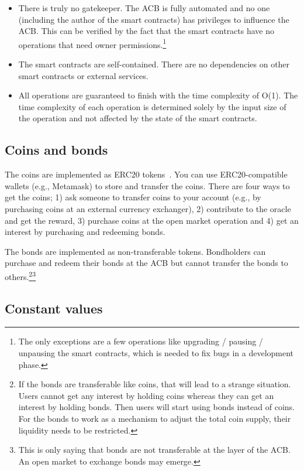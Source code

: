 \documentclass[dvipdfmx,a4paper]{article}
\begin{document}
\begin{itemize}
\item There is truly no gatekeeper. The ACB is fully automated and no one (including the author of the smart contracts) has privileges to influence the ACB. This can be verified by the fact that the smart contracts have no operations that need owner permissions.\footnote{The only exceptions are a few operations like upgrading / pausing / unpausing the smart contracts, which is needed to fix bugs in a development phase.}
\item The smart contracts are self-contained. There are no dependencies on other smart contracts or external services.
\item All operations are guaranteed to finish with the time complexity of O(1). The time complexity of each operation is determined solely by the input size of the operation and not affected by the state of the smart contracts.
\end{itemize}

\subsection{Coins and bonds}

The coins are implemented as ERC20 tokens~\cite{erc20token}. You can use ERC20-compatible wallets (e.g., Metamask) to store and transfer the coins. There are four ways to get the coins; 1) ask someone to transfer coins to your account (e.g., by purchasing coins at an external currency exchanger), 2) contribute to the oracle and get the reward, 3) purchase coins at the open market operation and 4) get an interest by purchasing and redeeming bonds.

The bonds are implemented as non-transferable tokens. Bondholders can purchase and redeem their bonds at the ACB but cannot transfer the bonds to others.\footnote{If the bonds are transferable like coins, that will lead to a strange situation. Users cannot get any interest by holding coins whereas they can get an interest by holding bonds. Then users will start using bonds instead of coins. For the bonds to work as a mechanism to adjust the total coin supply, their liquidity needs to be restricted.}\footnote{This is only saying that bonds are not transferable at the layer of the ACB. An open market to exchange bonds may emerge.}

\subsection{Constant values}
\end{document}

